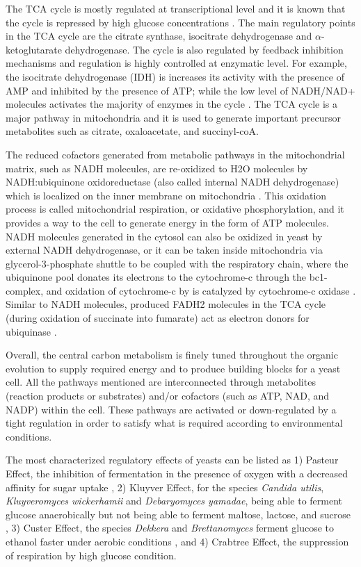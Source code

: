 The TCA cycle is mostly regulated at transcriptional level and it is known that the cycle is repressed by high glucose concentrations \cite{liu1999transcriptional}. The main regulatory points in the TCA cycle are the citrate synthase, isocitrate dehydrogenase and $\alpha$-ketoglutarate dehydrogenase. The cycle is also regulated by feedback inhibition mechanisms and regulation is highly controlled at enzymatic level. For example, the isocitrate dehydrogenase (IDH) is increases its activity with the presence of AMP and inhibited by the presence of ATP\cite{coleman1975regulation}; while the low level of NADH/NAD+ molecules activates the majority of enzymes in the cycle \cite{gadde1997mutations}. The TCA cycle is a major pathway in mitochondria and it is used to generate important precursor metabolites such as citrate, oxaloacetate, and succinyl-coA.

The reduced cofactors generated from metabolic pathways in the mitochondrial matrix, such as NADH molecules, are re-oxidized to H2O molecules by NADH:ubiquinone oxidoreductase (also called internal NADH dehydrogenase) which is localized on the inner membrane on mitochondria \cite{bakker2001stoichiometry}. This oxidation process is called mitochondrial respiration, or oxidative phosphorylation, and it provides a way to the cell to generate energy in the form of ATP molecules. NADH molecules generated in the cytosol can also be oxidized in yeast by external NADH dehydrogenase, or it can be taken inside mitochondria via glycerol-3-phosphate shuttle to be coupled with the respiratory chain, where the ubiquinone pool donates \cite{zitomer1979transcriptional} its electrons to the cytochrome-c through the bc1-complex, and oxidation of cytochrome-c by is catalyzed by cytochrome-c oxidase \cite{de1987mitochondrial}. Similar to NADH molecules, produced FADH2 molecules in the TCA cycle (during oxidation of succinate into fumarate) act as electron donors for ubiquinase \cite{cimini2009global}.

Overall, the central carbon metabolism is finely tuned throughout the organic evolution to supply required energy and to produce building blocks for a yeast cell. All the pathways mentioned are interconnected through metabolites (reaction products or substrates) and/or cofactors (such as ATP, NAD, and NADP) within the cell. These pathways are activated or down-regulated by a tight regulation in order to satisfy what is required according to environmental conditions.

The most characterized regulatory effects of yeasts can be listed as 1) Pasteur Effect, the inhibition of fermentation in the presence of oxygen with a decreased affinity for sugar uptake \cite{lagunas1983role}, 2) Kluyver Effect, for the species \emph{Candida utilis}, \emph{Kluyveromyces wickerhamii} and \emph{Debaryomyces yamadae}, being able to ferment glucose anaerobically but not being able to ferment maltose, lactose, and sucrose \cite{kaliterna1995transient}, 3) Custer Effect, the species \emph{Dekkera} and \emph{Brettanomyces} ferment glucose to ethanol faster under aerobic conditions \cite{scheffers1966stimulation}, and 4) Crabtree Effect, the suppression of respiration by high glucose condition.




